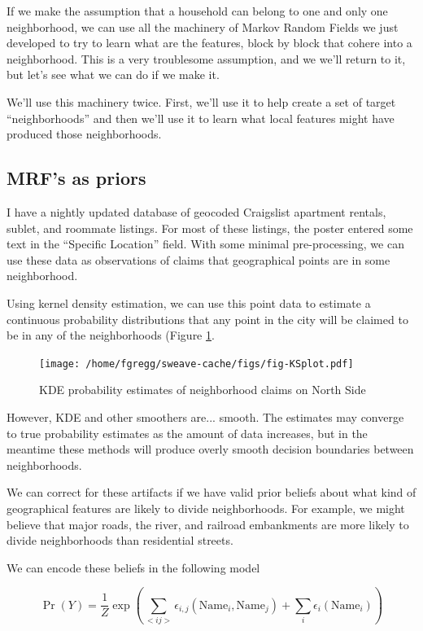 \documentclass{article}
\begin{document}
If we make the assumption that a household can belong to one and only
one neighborhood, we can use all the machinery of Markov Random Fields
we just developed to try to learn what are the features, block by
block that cohere into a neighborhood. This is a very troublesome
assumption, and we we'll return to it, but let's see what we can do
if we make it.

We'll use this machinery twice. First, we'll use it to help create a
set of target ``neighborhoods'' and then we'll use it to learn what
local features might have produced those neighborhoods.

\subsection{MRF's as priors}
I have a nightly updated database of geocoded Craigslist apartment
rentals, sublet, and roommate listings. For most of these listings,
the poster entered some text in the ``Specific Location'' field. With
some minimal pre-processing, we can use these data as observations of
claims that geographical points are in some neighborhood.

Using kernel density estimation, we can use this point data to
estimate a continuous probability distributions that any point in the
city will be claimed to be in any of the neighborhoods (Figure
\ref{fig:KDE}.

\begin{figure}
\texttt{[image: /home/fgregg/sweave-cache/figs/fig-KSplot.pdf]}
\caption{KDE probability estimates of neighborhood claims on North Side}
\label{fig:KDE}
\end{figure}

However, KDE and other smoothers are... smooth. The estimates may
converge to true probability estimates as the amount of data
increases, but in the meantime these methods will produce overly
smooth decision boundaries between neighborhoods. 

We can correct for these artifacts if we have valid prior beliefs
about what kind of geographical features are likely to divide
neighborhoods. For example, we might believe that major roads, the
river, and railroad embankments are more likely to divide
neighborhoods than residential streets. 

We can encode these beliefs in the following model

\begin{equation}
\Pr(Y) = \frac{1}{Z}\operatorname{exp}\left(\sum_{<i j>}\epsilon_{i,j}(\text{Name}_i,\text{Name}_j) + \sum_i\epsilon_i(\text{Name}_i)\right) 
\end{equation}
\end{document}
